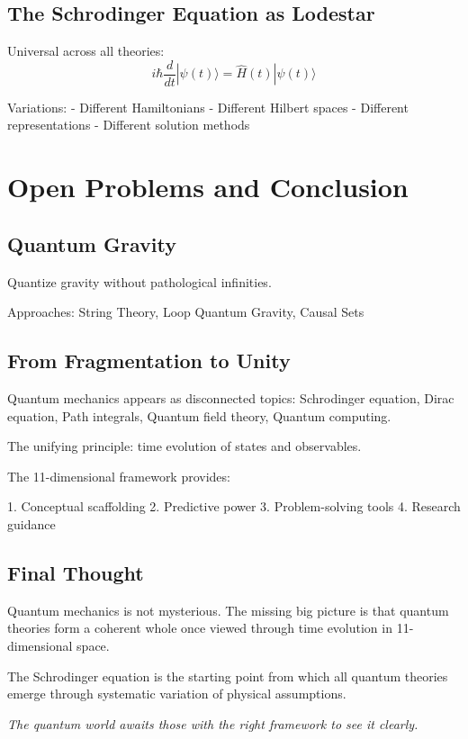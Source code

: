 \documentclass[12pt]{article}
\begin{document}
\subsection{The Schrodinger Equation as Lodestar}

Universal across all theories:
\[
i\hbar\frac{d}{dt}|\psi(t)\rangle = \hat{H}(t)|\psi(t)\rangle
\]

Variations:
- Different Hamiltonians
- Different Hilbert spaces
- Different representations
- Different solution methods

\section{Open Problems and Conclusion}

\subsection{Quantum Gravity}

Quantize gravity without pathological infinities.

Approaches: String Theory, Loop Quantum Gravity, Causal Sets

\subsection{From Fragmentation to Unity}

Quantum mechanics appears as disconnected topics: Schrodinger equation, Dirac equation, Path integrals, Quantum field theory, Quantum computing.

The unifying principle: time evolution of states and observables.

The 11-dimensional framework provides:

1. Conceptual scaffolding
2. Predictive power
3. Problem-solving tools
4. Research guidance

\subsection{Final Thought}

Quantum mechanics is not mysterious. The missing big picture is that quantum theories form a coherent whole once viewed through time evolution in 11-dimensional space.

The Schrodinger equation is the starting point from which all quantum theories emerge through systematic variation of physical assumptions.

\textit{The quantum world awaits those with the right framework to see it clearly.}
\end{document}
